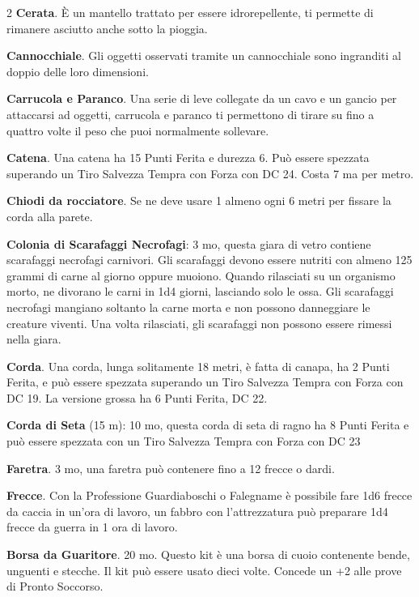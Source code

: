 \begin{multicols}{2}
\textbf{Cerata}. È un mantello trattato per essere idrorepellente, ti permette di rimanere asciutto anche sotto la pioggia.

\textbf{Cannocchiale}. Gli oggetti osservati tramite un cannocchiale sono ingranditi al doppio delle loro dimensioni.

\textbf{Carrucola e Paranco}. Una serie di leve collegate da un cavo e un gancio per attaccarsi ad oggetti, carrucola e paranco ti permettono di tirare su fino a quattro volte il peso che puoi normalmente sollevare.\label{Carrucola e Paranco}\hypertarget{Carrucola e paranco}{}

\textbf{Catena}\hypertarget{Catena}{}. Una catena ha 15 Punti Ferita e durezza 6. Può essere spezzata superando un Tiro Salvezza Tempra con Forza con DC 24. Costa 7 ma per metro.

\textbf{Chiodi da rocciatore}. Se ne deve usare 1 almeno ogni 6 metri per fissare la corda alla parete.

\textbf{Colonia di Scarafaggi Necrofagi}: 3 mo, questa giara di vetro contiene scarafaggi necrofagi carnivori. Gli scarafaggi devono essere nutriti con almeno 125 grammi di carne al giorno oppure muoiono. Quando rilasciati su un organismo morto, ne divorano le carni in 1d4 giorni, lasciando solo le ossa. Gli scarafaggi necrofagi mangiano soltanto la carne morta e non possono danneggiare le creature viventi. Una volta rilasciati, gli scarafaggi non possono essere rimessi nella giara.

\textbf{Corda}. Una corda, lunga solitamente 18 metri, è fatta di canapa, ha 2 Punti Ferita, e può essere spezzata superando un Tiro Salvezza Tempra con Forza con DC 19. La versione grossa ha 6 Punti Ferita, DC 22.\label{Corda}\hypertarget{Corda}{}

\textbf{Corda di Seta} (15 m): 10 mo, questa corda di seta di ragno ha 8 Punti Ferita e può essere spezzata con un Tiro Salvezza Tempra con Forza con DC 23

\textbf{Faretra}. 3 mo, una faretra può contenere fino a 12 frecce o dardi.\label{Faretra}\hypertarget{Faretra}{}

\textbf{Frecce}. Con la Professione Guardiaboschi o Falegname è possibile fare 1d6 frecce da caccia in un'ora di lavoro, un fabbro con l'attrezzatura può preparare 1d4 frecce da guerra in 1 ora di lavoro.

\textbf{Borsa da Guaritore}. 20 mo. \label{borsadaguaritore}\hypertarget{borsadaguaritore}{} Questo kit è una borsa di cuoio contenente bende, unguenti e stecche. Il kit può essere usato dieci volte. Concede un +2 alle prove di Pronto Soccorso.


\end{multicols}
